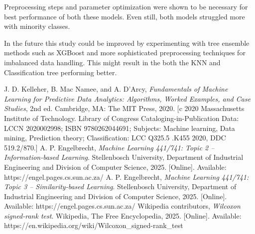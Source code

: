 \documentclass[conference]{IEEEtran}
\begin{document}
Preprocessing steps and parameter optimization were shown to be necessary for best performance of both these models. Even still, both models struggled more with minority classes.

In the future this study could be improved by experimenting with tree ensemble methods such as XGBoost and more sophisticated preprocessing techniques for imbalanced data handling. This might result in the both the KNN and Classification tree performing better.



\begin{thebibliography}{00}
 J. D. Kelleher, B. Mac Namee, and A. D’Arcy, \textit{Fundamentals of Machine Learning for Predictive Data Analytics: Algorithms, Worked Examples, and Case Studies}, 2nd ed. Cambridge, MA: The MIT Press, 2020. [c 2020 Massachusetts Institute of Technology. Library of Congress Cataloging-in-Publication Data: LCCN 2020002998; ISBN 9780262044691; Subjects: Machine learning, Data mining, Prediction theory; Classification: LCC Q325.5 .K455 2020, DDC 519.2/870.]
 A. P. Engelbrecht, \textit{Machine Learning 441/741: Topic 2 -- Information-based Learning}. Stellenbosch University, Department of Industrial Engineering and Division of Computer Science, 2025. [Online]. Available: https://engel.pages.cs.sun.ac.za/
 A. P. Engelbrecht, \textit{Machine Learning 441/741: Topic 3 -- Similarity-based Learning}. Stellenbosch University, Department of Industrial Engineering and Division of Computer Science, 2025. [Online]. Available: https://engel.pages.cs.sun.ac.za/
Wikipedia contributors, \textit{Wilcoxon signed-rank test}. Wikipedia, The Free Encyclopedia, 2025. [Online]. Available: https://en.wikipedia.org/wiki/Wilcoxon\_signed-rank\_test



\end{thebibliography}
\end{document}

